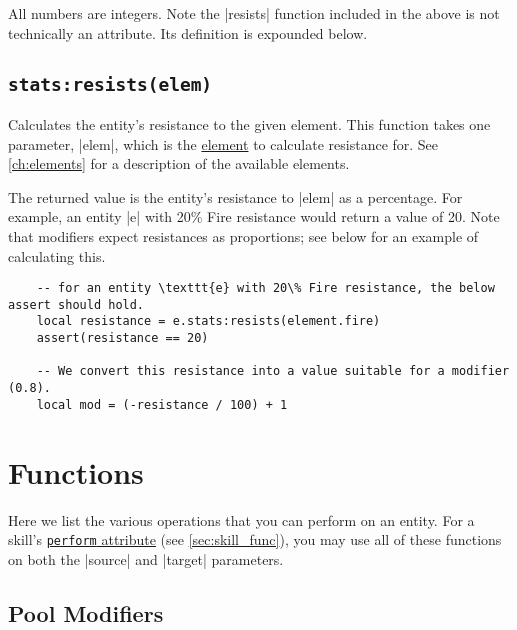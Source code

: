 All numbers are integers.
Note the |resists| function included in the above is not technically an attribute.
Its definition is expounded below.

\subsection{\lstinline{stats:resists(elem)}}
\label{sec:entity_stats_resists}

Calculates the entity's resistance to the given element.
This function takes one parameter, |elem|,
which is the \hyperref[ch:elements]{element} to calculate resistance for.
See \autoref{ch:elements} for a description of the available elements.

The returned value is the entity's resistance to |elem| as a percentage.
For example, an entity |e| with 20\% Fire resistance would return a value
of 20. Note that modifiers expect resistances as proportions; see below for
an example of calculating this.

\begin{lstlisting}
    -- for an entity \texttt{e} with 20\% Fire resistance, the below assert should hold.
    local resistance = e.stats:resists(element.fire)
    assert(resistance == 20)

    -- We convert this resistance into a value suitable for a modifier (0.8).
    local mod = (-resistance / 100) + 1
\end{lstlisting}

\section{Functions}
\label{sec:entity_func}

Here we list the various operations that you can perform on an entity.
For a skill's \hyperref[sec:skill_func]{\lstinline{perform} attribute}
(see \autoref{sec:skill_func}),
you may use all of these functions on both the |source| and |target| parameters.

\subsection{Pool Modifiers}
\label{sec:entity_func_pool}

